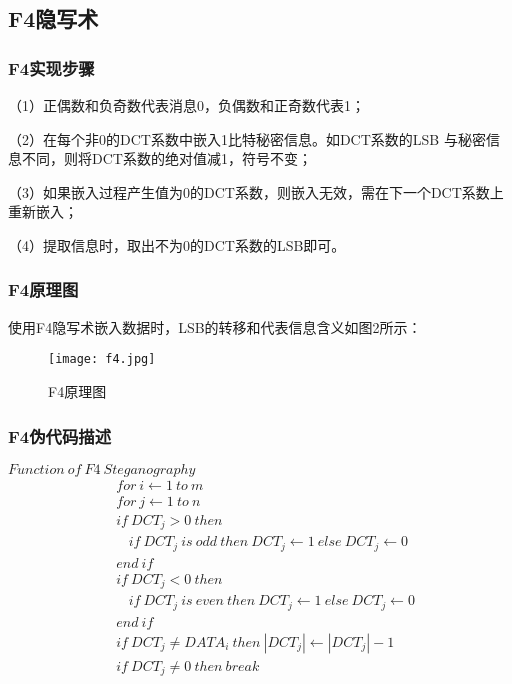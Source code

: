 \documentclass[onecolumn,a4paper,12pt]{article}
\begin{document}
\subsection{F4隐写术}

\subsubsection{F4实现步骤}

（1）正偶数和负奇数代表消息0，负偶数和正奇数代表1；

（2）在每个非0的DCT系数中嵌入1比特秘密信息。如DCT系数的LSB 与秘密信息不同，则将DCT系数的绝对值减1，符号不变；

（3）如果嵌入过程产生值为0的DCT系数，则嵌入无效，需在下一个DCT系数上重新嵌入；

（4）提取信息时，取出不为0的DCT系数的LSB即可。

\subsubsection{F4原理图}

使用F4隐写术嵌入数据时，LSB的转移和代表信息含义如图2所示：

\begin{figure}[H]
  \centering
  \texttt{[image: f4.jpg]}\\
  \caption{F4原理图}\label{F4原理图}
\end{figure}

\subsubsection{F4伪代码描述}
\qquad\qquad $Function\ of\ F4\ Steganography$
\begin{align*}
& for\ i \gets 1\ to\ m \\
& for\ j \gets 1\ to\ n \\
& if\ DCT_j>0\ then \\
& \ \ \ \ if\ DCT_j\ is\ odd\ then\ DCT_j \gets 1\ else\ DCT_j \gets 0 \\
& end\ if \\
& if\ DCT_j<0\ then \\
& \ \ \ \ if\ DCT_j\ is\ even\ then\ DCT_j \gets 1\ else\ DCT_j \gets 0 \\
& end\ if \\
& if\ DCT_j\not=DATA_i\ then\ \left|DCT_j\right| \gets \left|DCT_j\right|-1 \\
& if\ DCT_j\not=0\ then\ break
\end{align*}
\end{document}
